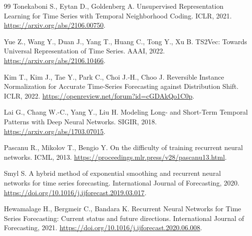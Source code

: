 \documentclass[12pt,fleqn]{article}
\begin{document}
\begin{thebibliography}{99}
Tonekaboni S., Eytan D., Goldenberg A.
Unsupervised Representation Learning for Time Series with Temporal Neighborhood Coding.
ICLR, 2021.
\url{https://arxiv.org/abs/2106.00750}.

Yue Z., Wang Y., Duan J., Yang T., Huang C., Tong Y., Xu B.
TS2Vec: Towards Universal Representation of Time Series.
AAAI, 2022.
\url{https://arxiv.org/abs/2106.10466}.

Kim T., Kim J., Tae Y., Park C., Choi J.-H., Choo J.
Reversible Instance Normalization for Accurate Time-Series Forecasting against Distribution Shift.
ICLR, 2022.
\url{https://openreview.net/forum?id=cGDAkQo1C0p}.

Lai G., Chang W.-C., Yang Y., Liu H.
Modeling Long- and Short-Term Temporal Patterns with Deep Neural Networks.
SIGIR, 2018.
\url{https://arxiv.org/abs/1703.07015}.

%
%
%
Pascanu R., Mikolov T., Bengio Y.
On the difficulty of training recurrent neural networks.
ICML, 2013.
\url{https://proceedings.mlr.press/v28/pascanu13.html}.

Smyl S.
A hybrid method of exponential smoothing and recurrent neural networks for time series forecasting.
International Journal of Forecasting, 2020.
\url{https://doi.org/10.1016/j.ijforecast.2019.03.017}.

Hewamalage H., Bergmeir C., Bandara K.
Recurrent Neural Networks for Time Series Forecasting: Current status and future directions.
International Journal of Forecasting, 2021.
\url{https://doi.org/10.1016/j.ijforecast.2020.06.008}.

\end{thebibliography}
\end{document}
